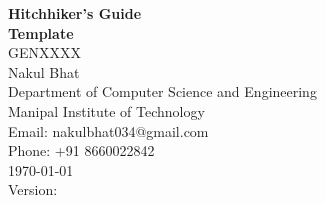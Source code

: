 \newcommand{\titlepagebreak}{\\[1em]}
\begin{titlepage}
    \vspace*{\fill} %

    \centering
    {\Huge \bfseries Hitchhiker's Guide\titlepagebreak Template}\\[1in]
    
    {\Large GENXXXX}\\[0.75in]
    
    {\huge Nakul Bhat}\\[0.5in]
    
    {\large Department of Computer Science and Engineering \titlepagebreak Manipal Institute of Technology}\\[0.5in]
    
    {\large Email: nakulbhat034@gmail.com \titlepagebreak Phone: +91 8660022842}\\[1.5cm]
    
    {\large \today}\\[0.5cm]
    
    {\large Version: \versionNumber}

    \vspace*{\fill} %
\end{titlepage}
\restoregeometry